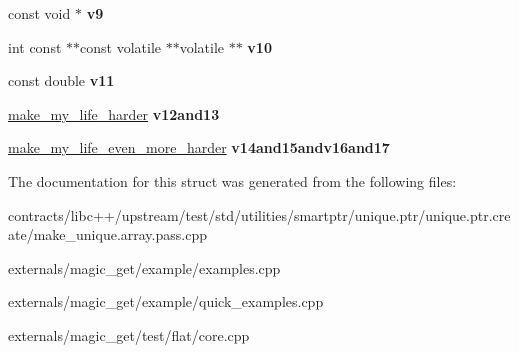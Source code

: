 \begin{DoxyCompactItemize}
\mbox{\label{classfoo_acd98ed88949fdab5ccfc31434b667c51}} 
const void $\ast$ {\bfseries v9}
\item 
\mbox{\label{classfoo_a007c3880b952fef4148c5e1787d518dc}} 
int const  $\ast$$\ast$const volatile $\ast$$\ast$volatile $\ast$$\ast$ {\bfseries v10}
\item 
\mbox{\label{classfoo_abe08b9faa48f71bb4b7fc69af0b2aee7}} 
const double {\bfseries v11}
\item 
\mbox{\label{classfoo_a693fbcf01206acae33de178039e82953}} 
\mbox{\hyperlink{structmake__my__life__harder}{make\+\_\+my\+\_\+life\+\_\+harder}} {\bfseries v12and13}
\item 
\mbox{\label{classfoo_a110f4cec44f4e22138372d905288bddd}} 
\mbox{\hyperlink{structmake__my__life__even__more__harder}{make\+\_\+my\+\_\+life\+\_\+even\+\_\+more\+\_\+harder}} {\bfseries v14and15andv16and17}
\end{DoxyCompactItemize}


The documentation for this struct was generated from the following files\+:\begin{DoxyCompactItemize}
\item 
contracts/libc++/upstream/test/std/utilities/smartptr/unique.\+ptr/unique.\+ptr.\+create/make\+\_\+unique.\+array.\+pass.\+cpp\item 
externals/magic\+\_\+get/example/examples.\+cpp\item 
externals/magic\+\_\+get/example/quick\+\_\+examples.\+cpp\item 
externals/magic\+\_\+get/test/flat/core.\+cpp\end{DoxyCompactItemize}
